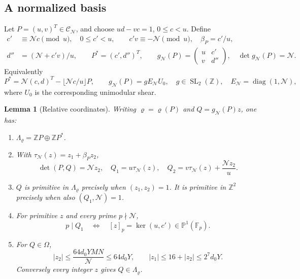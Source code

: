 \documentclass[11pt]{article}
\newtheorem{lemma}[theorem]{Lemma}
\theoremstyle{definition}
\newcommand{\Z}{\mathbb Z}
\newcommand{\GN}{\mathcal N}
\newcommand{\PP}{\mathbb P}
\newcommand{\CC}{\mathcal C}
\newcommand{\tauN}{\tau_{\GN}}
\newcommand{\gN}{g_{\GN}}
\theoremstyle{remark}
\numberwithin{equation}{section}
\begin{document}
\subsection{A normalized basis}\label{subsec:basis}
Let $P=(u,v)^T\in\CC_{\GN}$, and choose $ud-vc=1$, $0\le c<u$.
Define
\begin{equation}\label{eq:basis}
 \begin{split}
 c'&\equiv\GN c\pmod u,\quad0\le c'<u,
 \qquad c'v\equiv-\GN\pmod u,\quad \beta_P=c'/u,\\
 d''&=(\GN+c'v)/u,\qquad P^*=(c',d'')^T,\qquad
 \gN(P)=\begin{pmatrix}u&c'\\v&d''\end{pmatrix},\quad\det\gN(P)=\GN.
 \end{split}
\end{equation}
Equivalently
\begin{equation}\label{eq:shear}
 P^*=\GN(c,d)^T-\lfloor\GN c/u\rfloor P,\qquad
 \gN(P)=gE_{\GN}U_0,\quad
 g\in\operatorname{SL}_2(\Z),\quad E_{\GN}=\operatorname{diag}(1,\GN),
\end{equation}
where $U_0$ is the corresponding unimodular shear.
\begin{lemma}[Relative coordinates]\label{lem:coordinates}
Writing $\varrho=\varrho(P)$ and $Q=\gN(P)z$, one has:
\begin{enumerate}
\item $\Lambda_\varrho=\Z P\oplus\Z P^*$.
\item With $\tauN(z)=z_1+\beta_Pz_2$,
\begin{equation}\label{eq:coordinates}
 \det(P,Q)=\GN z_2,\quad Q_1=u\tauN(z),\quad
 Q_2=v\tauN(z)+\frac{\GN z_2}{u}.
\end{equation}
\item $Q$ is primitive in $\Lambda_\varrho$ precisely when
$(z_1,z_2)=1$. It is primitive in $\Z^2$ precisely when also
$(Q_1,\GN)=1$.
\item For primitive $z$ and every prime $p\nmid\GN$,
\begin{equation}\label{eq:kernel-line}
 p\mid Q_1\quad\Longleftrightarrow\quad
 [z]_p=\ker(u,c')\in\PP^1(\mathbb F_p).
\end{equation}
\item For $Q\in\Omega$,
\begin{equation}\label{eq:z-bound}
 |z_2|\le\frac{64d_0YMN}{\GN}\le64d_0Y,\qquad
 |z_1|\le16+|z_2|\le2^7d_0Y.
\end{equation}
Conversely every integer $z$ gives $Q\in\Lambda_\varrho$.
\end{enumerate}
\end{lemma}
\end{document}
